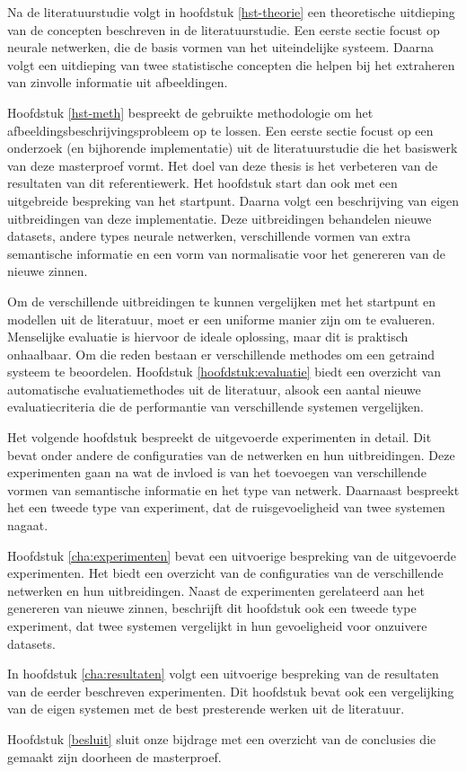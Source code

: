 Na de literatuurstudie volgt in hoofdstuk \ref{hst-theorie} een theoretische uitdieping van de concepten beschreven in de literatuurstudie. Een eerste sectie focust op neurale netwerken, die de basis vormen van het uiteindelijke systeem. Daarna volgt een uitdieping van twee statistische concepten die helpen bij het extraheren van zinvolle informatie uit afbeeldingen.

Hoofdstuk \ref{hst-meth} bespreekt de gebruikte methodologie om het afbeeldingsbeschrijvingsprobleem op te lossen. Een eerste sectie focust op een onderzoek (en bijhorende implementatie) uit de literatuurstudie die het basiswerk van deze masterproef vormt. Het doel van deze thesis is het verbeteren van de resultaten van dit referentiewerk. Het hoofdstuk start dan ook met een uitgebreide bespreking van het startpunt. Daarna volgt een beschrijving van eigen uitbreidingen van deze implementatie. Deze uitbreidingen behandelen nieuwe datasets, andere types neurale netwerken, verschillende vormen van extra semantische informatie en een vorm van normalisatie voor het genereren van de nieuwe zinnen. 

Om de verschillende uitbreidingen te kunnen vergelijken met het startpunt en modellen uit de literatuur, moet er een uniforme manier zijn om te evalueren. Menselijke evaluatie is hiervoor de ideale oplossing, maar dit is praktisch onhaalbaar. Om die reden bestaan er verschillende methodes om een getraind systeem te beoordelen. Hoofdstuk \ref{hoofdstuk:evaluatie} biedt een overzicht van automatische evaluatiemethodes uit de literatuur, alsook een aantal nieuwe evaluatiecriteria die de performantie van verschillende systemen vergelijken.

Het volgende hoofdstuk bespreekt de uitgevoerde experimenten in detail. Dit bevat onder andere de configuraties van de netwerken en hun uitbreidingen. Deze experimenten gaan na wat de invloed is van het toevoegen van verschillende vormen van semantische informatie en het type van netwerk. Daarnaast bespreekt het een tweede type van experiment, dat de ruisgevoeligheid van twee systemen nagaat.

Hoofdstuk \ref{cha:experimenten} bevat een uitvoerige bespreking van de uitgevoerde experimenten. Het biedt een overzicht van de configuraties van de verschillende netwerken en hun uitbreidingen. Naast de experimenten gerelateerd aan het genereren van nieuwe zinnen, beschrijft dit hoofdstuk ook een tweede type experiment, dat twee systemen vergelijkt in hun gevoeligheid voor onzuivere datasets.

In hoofdstuk \ref{cha:resultaten} volgt een uitvoerige bespreking van de resultaten van de eerder beschreven experimenten. Dit hoofdstuk bevat ook een vergelijking van de eigen systemen met de best presterende werken uit de literatuur.

Hoofdstuk \ref{besluit} sluit onze bijdrage met een overzicht van de conclusies die gemaakt zijn doorheen de masterproef.
 
